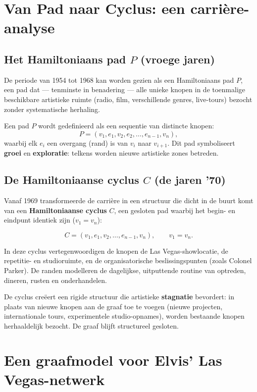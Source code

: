 \documentclass{book}
\begin{document}
	\section{Van Pad naar Cyclus: een carri\`ere-analyse}
	
	\subsection{Het Hamiltoniaans pad $P$ (vroege jaren)}
	
	De periode van 1954 tot 1968 kan worden gezien als een Hamiltoniaans pad $P$, een pad dat --- tenminste in benadering --- alle unieke knopen in de toenmalige beschikbare artistieke ruimte (radio, film, verschillende genres, live-tours) bezocht zonder systematische herhaling.
	
	Een pad $P$ wordt gedefinieerd als een sequentie van distincte knopen:
	\[
	P = (v_1, e_1, v_2, e_2, \ldots, e_{n-1}, v_n),
	\]
	waarbij elk $e_i$ een overgang (rand) is van $v_i$ naar $v_{i+1}$. Dit pad symboliseert \textbf{groei} en \textbf{exploratie}: telkens worden nieuwe artistieke zones betreden.
	
	\subsection{De Hamiltoniaanse cyclus $C$ (de jaren '70)}
	
	Vanaf 1969 transformeerde de carri\`ere in een structuur die dicht in de buurt komt van een \textbf{Hamiltoniaanse cyclus} $C$, een gesloten pad waarbij het begin- en eindpunt identiek zijn ($v_1 = v_n$):
	
	\[
	C = (v_1, e_1, v_2, \ldots, e_{n-1}, v_n), \qquad v_1 = v_n.
	\]
	
	\noindent In deze cyclus vertegenwoordigen de knopen de Las Vegas-showlocatie, de repetitie- en studioruimte, en de organisatorische beslissingspunten (zoals Colonel Parker). De randen modelleren de dagelijkse, uitputtende routine van optreden, dineren, rusten en onderhandelen.
	
	De cyclus cre\"eert een rigide structuur die artistieke \textbf{stagnatie} bevordert: in plaats van nieuwe knopen aan de graaf toe te voegen (nieuwe projecten, internationale tours, experimentele studio-opnames), worden bestaande knopen herhaaldelijk bezocht. De graaf blijft structureel gesloten.
	
	\section{Een graafmodel voor Elvis' Las Vegas-netwerk}
	
\end{document}
